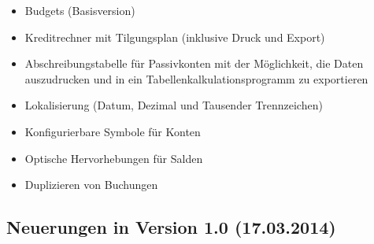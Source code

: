 \begin{itemize}
	\item Budgets (Basisversion)%
	\item Kreditrechner mit Tilgungsplan (inklusive Druck und Export)%
	\item Abschreibungstabelle für Passivkonten mit der Möglichkeit, die Daten auszudrucken und in ein Tabellenkalkulationsprogramm zu exportieren%
	\item Lokalisierung (Datum, Dezimal und Tausender Trennzeichen)%
	\item Konfigurierbare Symbole für Konten%
	\item Optische Hervorhebungen für Salden%
	\item Duplizieren von Buchungen%
\end{itemize}


\subsection{Neuerungen in Version 1.0 \textnormal{(17.03.2014)}}%

